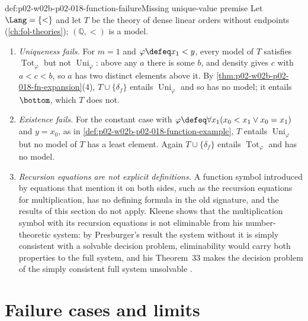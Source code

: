 \begin{hbwarning}{def:p02-w02b-p02-018-function-failure}{Missing unique-value premise}
Let \(\Lang=\{<\}\) and let \(T\) be the theory of dense linear orders
without endpoints (\cref{ch:fol-theories}); \((\mathbb Q,<)\) is a model.
\begin{enumerate}
 \item \emph{Uniqueness fails.}  For \(m=1\) and
       \(\varphi\defeq x_1<y\), every model of \(T\) satisfies
       \(\operatorname{Tot}_{\varphi}\) but not
       \(\operatorname{Uni}_{\varphi}\): above any \(a\) there is some \(b\),
       and density gives \(c\) with \(a<c<b\), so \(a\) has two distinct
       elements above it.  By
       \cref{thm:p02-w02b-p02-018-fn-expansion}(4),
       \(T\cup\{\delta_f\}\) entails \(\operatorname{Uni}_{\varphi}\) and so
       has no model; it entails \(\bottom\), which \(T\) does not.
 \item \emph{Existence fails.}  For the constant case with
       \(\varphi\defeq\forall x_1(x_0<x_1\lor x_0=x_1)\) and \(y=x_0\), as
       in \cref{def:p02-w02b-p02-018-function-example}, \(T\) entails
       \(\operatorname{Uni}_{\varphi}\) but no model of \(T\) has a least
       element.  Again \(T\cup\{\delta_f\}\) entails
       \(\operatorname{Tot}_{\varphi}\) and has no model.
 \item \emph{Recursion equations are not explicit definitions.}  A function
       symbol introduced by equations that mention it on both sides, such as
       the recursion equations for multiplication, has no defining formula in
       the old signature, and the results of this section do not apply.
       Kleene shows that the multiplication symbol with its recursion
       equations is not eliminable from his number-theoretic system: by
       Presburger's result the system without it is simply consistent with a
       solvable decision problem, eliminability would carry both properties
       to the full system, and his Theorem~33 makes the decision problem of
       the simply consistent full system unsolvable
       \cite[\S\,74, Example~4, p.~407; \S\,61, Theorem~33, p.~314]{Kleene1952}.
\end{enumerate}
\end{hbwarning}

\section{Failure cases and limits}
\label{sec:p02-w02b-p02-018-limits}

